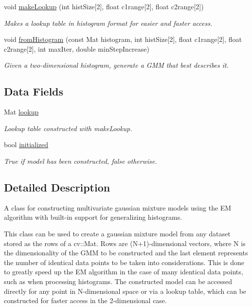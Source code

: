 \begin{DoxyCompactItemize}
void \hyperlink{classGaussianMixtureModel_af12b9007da58f868a0724f1113d59c30}{make\-Lookup} (int hist\-Size\mbox{[}2\mbox{]}, float c1range\mbox{[}2\mbox{]}, float c2range\mbox{[}2\mbox{]})
\begin{DoxyCompactList}\small\item\em \-Makes a lookup table in histogram format for easier and faster access. \end{DoxyCompactList}\item 
void \hyperlink{classGaussianMixtureModel_af2d24c4841b1bacb985d9a62afafc1c0}{from\-Histogram} (const \-Mat histogram, int hist\-Size\mbox{[}2\mbox{]}, float c1range\mbox{[}2\mbox{]}, float c2range\mbox{[}2\mbox{]}, int max\-Iter, double min\-Step\-Increase)
\begin{DoxyCompactList}\small\item\em \-Given a two-\/dimensional histogram, generate a \-G\-M\-M that best describes it. \end{DoxyCompactList}\end{DoxyCompactItemize}
\subsection*{\-Data \-Fields}
\begin{DoxyCompactItemize}
\item 
\-Mat \hyperlink{classGaussianMixtureModel_afde458726dd2e66b469ed68c1234bee3}{lookup}
\begin{DoxyCompactList}\small\item\em \-Lookup table constructed with make\-Lookup. \end{DoxyCompactList}\item 
bool \hyperlink{classGaussianMixtureModel_a70dc4df2fca35a0795b06745e85b2979}{initialized}
\begin{DoxyCompactList}\small\item\em \-True if model has been constructed, false otherwise. \end{DoxyCompactList}\end{DoxyCompactItemize}


\subsection{\-Detailed \-Description}
\-A class for constructing multivariate gaussian mixture models using the \-E\-M algorithm with built-\/in support for generalizing histograms. 

\-This class can be used to create a gaussian mixture model from any dataset stored as the rows of a cv\-::\-Mat. \-Rows are (\-N+1)-\/dimensional vectors, where \-N is the dimensionality of the \-G\-M\-M to be constructed and the last element represents the number of identical data points to be taken into considerations. \-This is done to greatly speed up the \-E\-M algorithm in the case of many identical data points, such as when processing histograms. \-The constructed model can be accessed directly for any point in \-N-\/dimensional space or via a lookup table, which can be constructed for faster access in the 2-\/dimensional case. 

